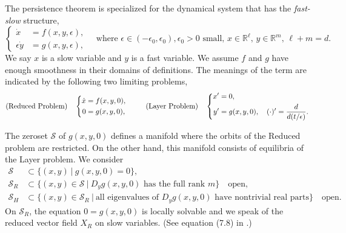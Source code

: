 \documentclass[a4paper,11pt]{article}
\theoremstyle{remark}
\begin{document}
The persistence theorem is specialized for the dynamical system that has the {\it fast-slow} structure, 
\begin{equation} \label{eq:fast-slow}
 \left\{
 \begin{aligned}
  \dot{x}&=f(x,y,\epsilon),\\
  \epsilon\dot{y}&=g(x,y,\epsilon),
 \end{aligned}\right. \quad \text{where $\epsilon \in (-\epsilon_0,\epsilon_0), \epsilon_0>0$ small, $x\in \mathbb{R}^\ell$, $y\in \mathbb{R}^m$, $\ell+m=d$.}
\end{equation}
We say $x$ is a slow variable and $y$ is a fast variable. We assume $f$ and $g$ have enough smoothness in their domains of definitions. The meanings of the term are indicated by the following two limiting problems,
\begin{equation*} %
 \text{(Reduced Problem)}\quad\left\{
 \begin{aligned}
    \dot{x} &= f(x,y,0),\\
    0&= g(x,y,0),
 \end{aligned}\right. 
 \hspace{2.5em}
 \text{(Layer Problem)} \quad  
 \left\{
 \begin{aligned}
    x'&= 0,\\
    y'&= g(x,y,0), \quad (\cdot)' = \frac{d}{d(t/\epsilon)}.%
 \end{aligned}\right. 
\end{equation*}

The zeroset $\mathcal{S}$ of $g(x,y,0)$ defines a manifold where the orbits of the Reduced problem are restricted. On the other hand, this manifold consists of equilibria of the Layer problem. We consider 
\begin{align*}
 \mathcal{S}&\subset \Big\{ (x,y)\:\Big|\: g(x,y,0)=0\Big\},\\
 \mathcal{S}_R&\subset \Big\{ (x,y)\in \mathcal{S} \:\Big|\: \text{$D_y g(x,y,0)$ has the full rank $m$}\Big\} \quad \text{open},\\
 \mathcal{S}_H&\subset \Big\{ (x,y)\in \mathcal{S}_R \:\Big|\: \text{all eigenvalues of $D_y g(x,y,0)$ have nontrivial real parts}\Big\}\quad \text{open}. 
\end{align*}
On $\mathcal{S}_R$, the equation $0=g(x,y,0)$ is locally solvable and we speak of the reduced vector field $X_R$ on slow variables. (See equation (7.8) in \cite{fenichel_geometric_1979}.) %
\end{document}
